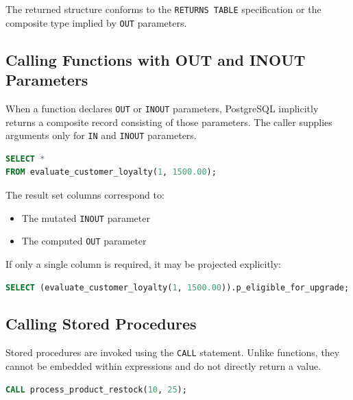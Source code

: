 \documentclass[12pt,a4paper]{article}
\begin{document}
The returned structure conforms to the \texttt{RETURNS TABLE} specification or the composite type implied by \texttt{OUT} parameters.

\subsection{Calling Functions with OUT and INOUT Parameters}

When a function declares \texttt{OUT} or \texttt{INOUT} parameters, PostgreSQL implicitly returns a composite record consisting of those parameters. The caller supplies arguments only for \texttt{IN} and \texttt{INOUT} parameters.

\begin{lstlisting}[language=SQL]
SELECT *
FROM evaluate_customer_loyalty(1, 1500.00);
\end{lstlisting}

The result set columns correspond to:

\begin{itemize}
    \item The mutated \texttt{INOUT} parameter
    \item The computed \texttt{OUT} parameter
\end{itemize}

If only a single column is required, it may be projected explicitly:

\begin{lstlisting}[language=SQL]
SELECT (evaluate_customer_loyalty(1, 1500.00)).p_eligible_for_upgrade;
\end{lstlisting}

\subsection{Calling Stored Procedures}

Stored procedures are invoked using the \texttt{CALL} statement. Unlike functions, they cannot be embedded within expressions and do not directly return a value.

\begin{lstlisting}[language=SQL, caption={Basic Procedure Invocation}]
CALL process_product_restock(10, 25);
\end{lstlisting}
\end{document}
